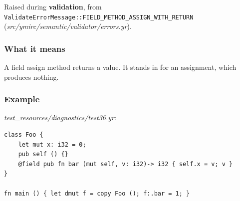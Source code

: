 Raised during \textbf{validation}, from \texttt{ValidateErrorMessage::\allowbreak{}FIELD\_\allowbreak{}METHOD\_\allowbreak{}ASSIGN\_\allowbreak{}WITH\_\allowbreak{}RETURN} (\textit{src/\allowbreak{}ymirc/\allowbreak{}semantic/\allowbreak{}validator/\allowbreak{}errors.yr}).

\subsubsection*{What it means}

A field assign method returns a value. It stands in for an assignment, which produces nothing.

\subsubsection*{Example}

\textit{test\_\allowbreak{}resources/\allowbreak{}diagnostics/\allowbreak{}test36.yr}:

\begin{lstlisting}[style=coloredverbatimError]
class Foo {
    let mut x: i32 = 0;
    pub self () {}
    @field pub fn bar (mut self, v: i32)-> i32 { self.x = v; v }
}

fn main () { let dmut f = copy Foo (); f:.bar = 1; }
\end{lstlisting}

